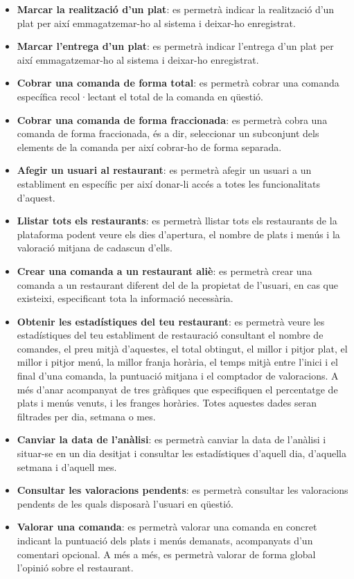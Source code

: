 \begin{itemize}
\item \textbf{Marcar la realització d'un plat}: es permetrà indicar la realització d'un plat per així emmagatzemar-ho al sistema i deixar-ho enregistrat.
\item \textbf{Marcar l'entrega d'un plat}: es permetrà indicar l'entrega d'un plat per així emmagatzemar-ho al sistema i deixar-ho enregistrat.
\item \textbf{Cobrar una comanda de forma total}: es permetrà cobrar una comanda específica recol·lectant el total de la comanda en qüestió.
\item \textbf{Cobrar una comanda de forma fraccionada}: es permetrà cobra una comanda de forma fraccionada, és a dir, seleccionar un subconjunt dels elements de la comanda per així cobrar-ho de forma separada.
\item \textbf{Afegir un usuari al restaurant}: es permetrà afegir un usuari a un establiment en específic per així donar-li accés a totes les funcionalitats d'aquest.
\item \textbf{Llistar tots els restaurants}: es permetrà llistar tots els restaurants de la plataforma podent veure els dies d'apertura, el nombre de plats i menús i la valoració mitjana de cadascun d'ells.
\item \textbf{Crear una comanda a un restaurant aliè}: es permetrà crear una comanda a un restaurant diferent del de la propietat de l'usuari, en cas que existeixi, especificant tota la informació necessària.
\item \textbf{Obtenir les estadístiques del teu restaurant}: es permetrà veure les estadístiques del teu establiment de restauració consultant el nombre de comandes, el preu mitjà d'aquestes, el total obtingut, el millor i pitjor plat, el millor i pitjor menú, la millor franja horària, el temps mitjà entre l'inici i el final d'una comanda, la puntuació mitjana i el comptador de valoracions. A més d'anar acompanyat de tres gràfiques que especifiquen el percentatge de plats i menús venuts, i les franges horàries. Totes aquestes dades seran filtrades per dia, setmana o mes.
\item \textbf{Canviar la data de l'anàlisi}: es permetrà canviar la data de l'anàlisi i situar-se en un dia desitjat i consultar les estadístiques d'aquell dia, d'aquella setmana i d'aquell mes.
\item \textbf{Consultar les valoracions pendents}: es permetrà consultar les valoracions pendents de les quals disposarà l'usuari en qüestió.
\item \textbf{Valorar una comanda}: es permetrà valorar una comanda en concret indicant la puntuació dels plats i menús demanats, acompanyats d'un comentari opcional. A més a més, es permetrà valorar de forma global l'opinió sobre el restaurant.

\end{itemize}
